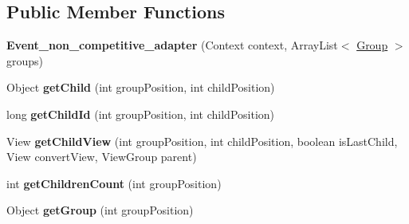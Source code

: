 \subsection*{Public Member Functions}
\begin{DoxyCompactItemize}
\item 
\hypertarget{classantardhvani_1_1du_1_1ac_1_1in_1_1_adapter_1_1_event__non__competitive__adapter_a1df78b6cf07165082ffcfcfbbdb09029}{}{\bfseries Event\+\_\+non\+\_\+competitive\+\_\+adapter} (Context context, Array\+List$<$ \hyperlink{classantardhvani_1_1du_1_1ac_1_1in_1_1_adapter_1_1_group}{Group} $>$ groups)\label{classantardhvani_1_1du_1_1ac_1_1in_1_1_adapter_1_1_event__non__competitive__adapter_a1df78b6cf07165082ffcfcfbbdb09029}

\item 
\hypertarget{classantardhvani_1_1du_1_1ac_1_1in_1_1_adapter_1_1_event__non__competitive__adapter_a9bc99df276b1389ca39494a20079442b}{}Object {\bfseries get\+Child} (int group\+Position, int child\+Position)\label{classantardhvani_1_1du_1_1ac_1_1in_1_1_adapter_1_1_event__non__competitive__adapter_a9bc99df276b1389ca39494a20079442b}

\item 
\hypertarget{classantardhvani_1_1du_1_1ac_1_1in_1_1_adapter_1_1_event__non__competitive__adapter_a8ea6d870de74d7c6b6cca72498030c28}{}long {\bfseries get\+Child\+Id} (int group\+Position, int child\+Position)\label{classantardhvani_1_1du_1_1ac_1_1in_1_1_adapter_1_1_event__non__competitive__adapter_a8ea6d870de74d7c6b6cca72498030c28}

\item 
\hypertarget{classantardhvani_1_1du_1_1ac_1_1in_1_1_adapter_1_1_event__non__competitive__adapter_aa0af54543ff6e76088211117105d64c5}{}View {\bfseries get\+Child\+View} (int group\+Position, int child\+Position, boolean is\+Last\+Child, View convert\+View, View\+Group parent)\label{classantardhvani_1_1du_1_1ac_1_1in_1_1_adapter_1_1_event__non__competitive__adapter_aa0af54543ff6e76088211117105d64c5}

\item 
\hypertarget{classantardhvani_1_1du_1_1ac_1_1in_1_1_adapter_1_1_event__non__competitive__adapter_a31d37f5f16313658f3ba8b40e8a458b9}{}int {\bfseries get\+Children\+Count} (int group\+Position)\label{classantardhvani_1_1du_1_1ac_1_1in_1_1_adapter_1_1_event__non__competitive__adapter_a31d37f5f16313658f3ba8b40e8a458b9}

\item 
\hypertarget{classantardhvani_1_1du_1_1ac_1_1in_1_1_adapter_1_1_event__non__competitive__adapter_a094f999d2779606724ac5b2aad5218be}{}Object {\bfseries get\+Group} (int group\+Position)\label{classantardhvani_1_1du_1_1ac_1_1in_1_1_adapter_1_1_event__non__competitive__adapter_a094f999d2779606724ac5b2aad5218be}


\end{DoxyCompactItemize}
